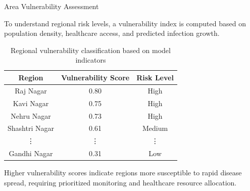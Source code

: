 \documentclass{beamer}
\begin{document}
\begin{frame}{Area Vulnerability Assessment}

To understand regional risk levels, a vulnerability index is computed
based on population density, healthcare access, and predicted infection growth.

\begin{table}
\centering
\begin{tabular}{|c|c|c|}
\hline
Region & Vulnerability Score & Risk Level \\
\hline
Raj Nagar & 0.80 & High \\
Kavi Nagar & 0.75 & High \\
Nehru Nagar & 0.73 & High \\
Shashtri Nagar & 0.61 & Medium \\
\vdots & \vdots & \vdots \\
Gandhi Nagar & 0.31 & Low \\
\hline
\end{tabular}
\caption{Regional vulnerability classification based on model indicators}
\end{table}

\vspace{0.2cm}
\small
Higher vulnerability scores indicate regions more susceptible to rapid disease spread,
requiring prioritized monitoring and healthcare resource allocation.

\end{frame}

\end{document}
